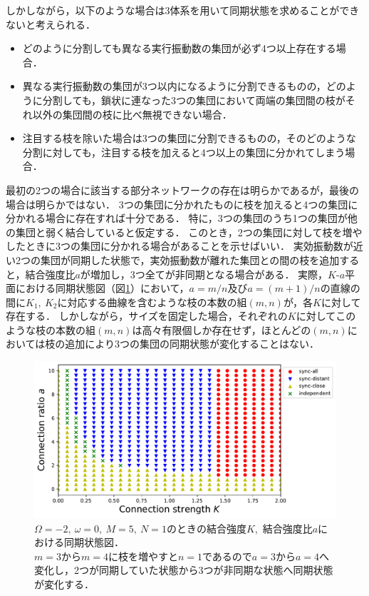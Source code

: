 \documentclass[../main]{subfiles}
\begin{document}
しかしながら，以下のような場合は3体系を用いて同期状態を求めることができないと考えられる．
\begin{itemize}
    \item 
    どのように分割しても異なる実行振動数の集団が必ず4つ以上存在する場合．
    \item
    異なる実行振動数の集団が3つ以内になるように分割できるものの，どのように分割しても，鎖状に連なった3つの集団において両端の集団間の枝がそれ以外の集団間の枝に比べ無視できない場合．
    \item
    注目する枝を除いた場合は3つの集団に分割できるものの，そのどのような分割に対しても，注目する枝を加えると4つ以上の集団に分かれてしまう場合．
\end{itemize}

最初の2つの場合に該当する部分ネットワークの存在は明らかであるが，最後の場合は明らかではない．
3つの集団に分かれたものに枝を加えると4つの集団に分かれる場合に存在すれば十分である．
特に，3つの集団のうち1つの集団が他の集団と弱く結合していると仮定する．
このとき，2つの集団に対して枝を増やしたときに3つの集団に分かれる場合があることを示せばいい．
実効振動数が近い2つの集団が同期した状態で，実効振動数が離れた集団との間の枝を追加すると，結合強度比$a$が増加し，3つ全てが非同期となる場合がある．
実際，$K$-$a$平面における同期状態図（図\ref{fig:3body-phase-m5}）において，$a=m/n$及び$a=(m+1)/n$の直線の間に$K_1,\ K_2$に対応する曲線を含むような枝の本数の組$(m,n)$が，各$K$に対して存在する．
しかしながら，サイズを固定した場合，それぞれの$K$に対してこのような枝の本数の組$(m,n)$は高々有限個しか存在せず，ほとんどの$(m,n)$においては枝の追加により3つの集団の同期状態が変化することはない．

\begin{figure}[tbp]
    \centering
    \includegraphics[width=135mm]{./images/three-body-phase-m5.pdf}
    \centering
    \caption{$\Omega=-2,\ \omega=0,\ M=5,\ N=1$のときの結合強度$K$,\ 結合強度比$a$における同期状態図．\\
    $m=3$から$m=4$に枝を増やすと$n=1$であるので$a=3$から$a=4$へ変化し，2つが同期していた状態から3つが非同期な状態へ同期状態が変化する．}
    \label{fig:3body-phase-m5}
\end{figure}
\end{document}
